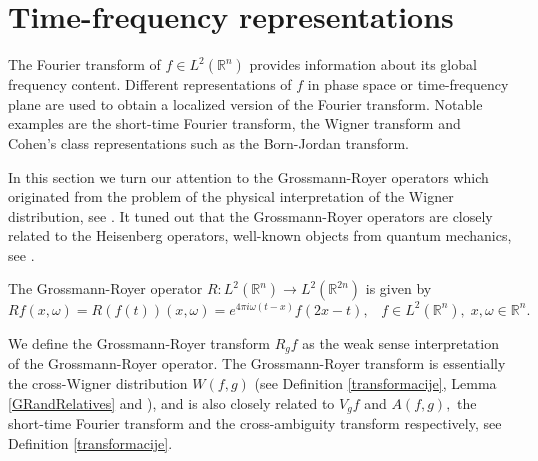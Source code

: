\documentclass{article}
\theoremstyle{thmstyleone}
\theoremstyle{thmstyletwo}%
\theoremstyle{thmstylethree}%
\begin{document}
\section{Time-frequency representations}  \label{Sec4}

The Fourier transform of $f \in L^2 (\mathbb R^n)$ provides  information about its global frequency content. Different representations of $f$ in phase space or time-frequency plane are used to obtain a localized version of the Fourier transform. Notable examples are the short-time Fourier transform, the Wigner transform and Cohen's class representations such as the Born-Jordan transform.

In this section we turn our attention to the Grossmann-Royer operators which originated from the problem of the
physical interpretation of the Wigner distribution, see \cite{Grossmann, Royer}.
It tuned out that the Grossmann-Royer operators 
are closely related to the Heisenberg operators, well-known objects from quantum mechanics, see \cite{deGosson2011, deGosson2017}. 


The  Grossmann-Royer operator $ R : L^2 (\mathbb{R}^n) \rightarrow L^2 (\mathbb{R}^{2n})  $ is given by
\begin{equation} \label{GROp}
R f (x,\omega) =  R  (f(t) )(x,\omega)  = e^{4\pi i\omega (t-x)} f(2x - t), \;\;\; f \in L^2 (\mathbb{R}^n),\; x,\omega \in \mathbb{R}^n.
\end{equation}


We define the Grossmann-Royer transform $R_g f$ 
as the weak sense interpretation of the Grossmann-Royer operator.
The Grossmann-Royer transform is essentially the cross-Wigner distribution  $ W(f,g)$
(see Definition \ref{transformacije}, Lemma  \ref{GRandRelatives}
and \cite[Definition 12]{deGosson2017}), and is also closely related to  $V_g f$ and $A(f,g),$ the short-time Fourier transform and the cross-ambiguity transform respectively, see  Definition \ref{transformacije}.
\end{document}
